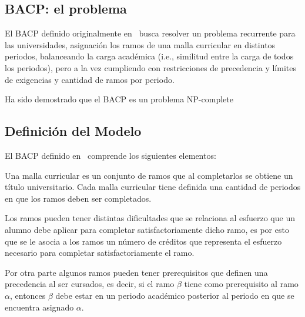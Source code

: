 \documentclass[letterpaper,10pt]{article}
\begin{document}

\subsection{BACP: el problema}
El BACP definido originalmente en~\cite{csplibprob030} busca resolver un problema recurrente para las universidades, asignación los ramos de una malla curricular en distintos periodos, balanceando la carga académica (i.e., similitud entre la carga de todos los periodos), pero a la vez cumpliendo con restricciones de precedencia y límites de exigencias y cantidad de ramos por periodo.

Ha sido demostrado que el BACP es un problema NP-complete~\cite{balac,Monette07acp}

\subsection{Definición del Modelo}
El BACP definido en~\cite{DBLP:journals/corr/cs-PL-0110007} comprende
los siguientes elementos:

Una malla curricular es un conjunto de ramos que al completarlos se obtiene un título universitario. Cada malla curricular tiene definida una cantidad de periodos en que los ramos deben ser completados.

Los ramos pueden tener distintas dificultades que se relaciona al esfuerzo que un alumno debe aplicar para completar satisfactoriamente dicho ramo, es por esto que se le asocia a los ramos un n\'umero de créditos que representa el esfuerzo necesario para completar satisfactoriamente el ramo.

Por otra parte algunos ramos pueden tener prerequisitos que definen una precedencia al ser cursados, es decir, si el ramo $\beta$ tiene como prerequisito al ramo $\alpha$, entonces $\beta$ debe estar en un periodo académico posterior al periodo en que se encuentra asignado $\alpha$.
\end{document}
